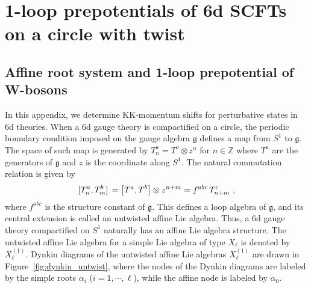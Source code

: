 \appendix

\section{1-loop prepotentials of 6d SCFTs on a circle with twist} \label{appendix:1-loop}

\subsection{Affine root system and 1-loop prepotential of W-bosons}\label{sec:App-affineroots}

In this appendix, we determine KK-momentum shifts for perturbative states in 6d theories. When a 6d gauge theory is compactified on a circle, the periodic boundary condition imposed on the gauge algebra $ \mathfrak{g} $ defines a map from $ S^1 $ to $ \mathfrak{g} $. The space of such map is generated by $ T_n^a =  T^a \otimes z^n $ for $ n \in \mathbb{Z} $ where $ T^a $ are the generators of $ \mathfrak{g} $ and $ z $ is the coordinate along $ S^1 $. The natural commutation relation is given by
\begin{align}
\comm*{T_n^a}{T_m^b} = \comm{T^a}{T^b} \otimes z^{n+m} = f^{abc} \,T_{n+m}^c\ ,
\end{align}
where $ f^{abc} $ is the structure constant of $ \mathfrak{g} $. This defines a loop algebra of $ \mathfrak{g} $, and its central extension is called an untwisted affine Lie algebra. Thus, a 6d gauge theory compactified on $ S^1 $ naturally has an affine Lie algebra structure. The untwisted affine Lie algebra for a simple Lie algebra of type $ X_\ell $ is denoted by $ X_\ell^{(1)}$. Dynkin diagrams of the untwisted affine Lie algebras $ X_\ell^{(1)}$ are drawn in Figure~\ref{fig:dynkin_untwist}, where the nodes of the Dynkin diagrams are labeled by the simple roots $\alpha_i$ ($i=1, \cdots, \ell$), while the affine node is labeled by $\alpha_0$. 

